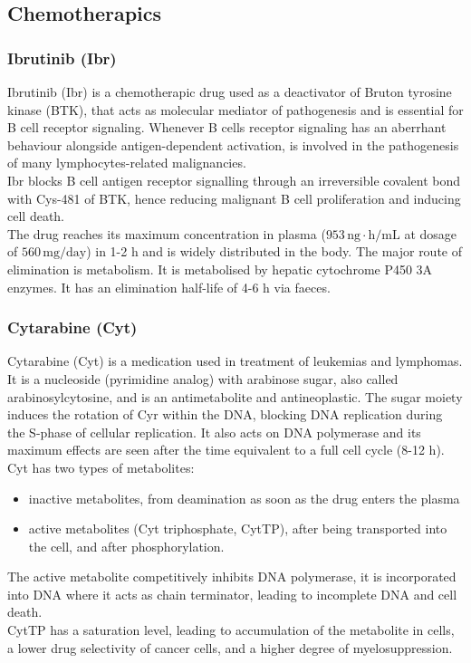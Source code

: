 \subsection{Chemotherapics}
\subsubsection{Ibrutinib (Ibr)}
Ibrutinib (Ibr) is a chemotherapic drug used as a deactivator of Bruton tyrosine kinase (BTK), that acts as molecular mediator of pathogenesis and is essential for B cell receptor signaling\cite{ibr-1}.  
Whenever B cells receptor signaling has an aberrhant behaviour alongside antigen-dependent activation, is involved in the pathogenesis of many lymphocytes-related malignancies.\\
Ibr blocks B cell antigen receptor signalling through an irreversible covalent bond with Cys-481 of BTK, hence reducing malignant B cell proliferation and inducing cell death.\\
The drug reaches its maximum concentration in plasma ($953\,\text{ng}\cdot\text{h}/\text{mL}$ at dosage of $560\,\text{mg}/\text{day}$) in 1-2 h and is widely distributed in the body. The major route of elimination is metabolism. It is metabolised by hepatic cytochrome P450 3A enzymes. It has an elimination half-life of 4-6 h via faeces.

\subsubsection{Cytarabine (Cyt)}
Cytarabine (Cyt) is a medication used in treatment of leukemias and lymphomas. It is a nucleoside (pyrimidine analog) with arabinose sugar, also called arabinosylcytosine, and is an antimetabolite and antineoplastic.
The sugar moiety induces the rotation of Cyr within the DNA, blocking DNA replication during the S-phase of cellular replication. It also acts on DNA polymerase and its maximum effects are seen after the time equivalent to a full cell cycle (8-12 h).
Cyt has two types of metabolites: 
\begin{itemize}
	\item inactive metabolites, from deamination as soon as the drug enters the plasma
	\item active metabolites (Cyt triphosphate, CytTP), after being transported into the cell, and after phosphorylation.
\end{itemize}
The active metabolite competitively inhibits DNA polymerase, it is incorporated into DNA where it acts as chain terminator, leading to incomplete DNA and cell death.\\
CytTP has a saturation level, leading to accumulation of the metabolite in cells, a lower drug selectivity of cancer cells, and a higher degree of myelosuppression.\cite{cyt-1, cyt-2}
